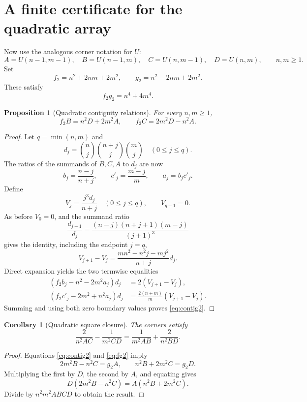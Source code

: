 \documentclass[11pt]{article}
\numberwithin{equation}{section}
\newtheorem{proposition}[theorem]{Proposition}
\newtheorem{corollary}[theorem]{Corollary}
\theoremstyle{definition}
\theoremstyle{remark}
\begin{document}
\section{A finite certificate for the quadratic array}\label{sec:quadratic}

Now use the analogous corner notation for $U$:
\[
 A=U(n-1,m-1),\quad B=U(n-1,m),\quad
 C=U(n,m-1),\quad D=U(n,m),
 \qquad n,m\geq1.
\]
Set
\begin{equation}\label{eq:f2g2}
 f_2=n^2+2nm+2m^2,\qquad g_2=n^2-2nm+2m^2.
\end{equation}
These satisfy
\begin{equation}\label{eq:fg2}
 f_2g_2=n^4+4m^4.
\end{equation}

\begin{proposition}[Quadratic contiguity relations]\label{prop:contig2}
For every $n,m\geq1$,
\begin{equation}\label{eq:contig2}
 \boxed{f_2B=n^2D+2m^2A,\qquad f_2C=2m^2D-n^2A.}
\end{equation}
\end{proposition}
\begin{proof}
Let $q=\min(n,m)$ and
\[
 d_j=\binom nj\binom{n+j}j\binom mj\quad(0\leq j\leq q).
\]
The ratios of the summands of $B,C,A$ to $d_j$ are now
\[
 b_j=\frac{n-j}{n+j},\qquad c'_j=\frac{m-j}{m},\qquad a_j=b_jc'_j.
\]
Define
\begin{equation}\label{eq:V}
 V_j=\frac{j^3d_j}{n+j}\quad(0\leq j\leq q),\qquad V_{q+1}=0.
\end{equation}
As before $V_0=0$, and the summand ratio
\[
 \frac{d_{j+1}}{d_j}
 =\frac{(n-j)(n+j+1)(m-j)}{(j+1)^3}
\]
gives the identity, including the endpoint $j=q$,
\begin{equation}\label{eq:deltaV}
 V_{j+1}-V_j=\frac{mn^2-n^2j-mj^2}{n+j}d_j.
\end{equation}
Direct expansion yields the two termwise equalities
\begin{align*}
 (f_2b_j-n^2-2m^2a_j)d_j&=2(V_{j+1}-V_j),\\
 (f_2c'_j-2m^2+n^2a_j)d_j&=\frac{2(n+m)}m(V_{j+1}-V_j).
\end{align*}
Summing and using both zero boundary values proves \eqref{eq:contig2}.
\end{proof}

\begin{corollary}[Quadratic square closure]\label{cor:closed2}
The corners satisfy
\begin{equation}\label{eq:closed2}
 \frac2{n^2AC}-\frac1{m^2CD}
 =\frac1{m^2AB}+\frac2{n^2BD}.
\end{equation}
\end{corollary}
\begin{proof}
Equations \eqref{eq:contig2} and \eqref{eq:fg2} imply
\[
 2m^2B-n^2C=g_2A,\qquad n^2B+2m^2C=g_2D.
\]
Multiplying the first by $D$, the second by $A$, and equating gives
\[
 D(2m^2B-n^2C)=A(n^2B+2m^2C).
\]
Divide by $n^2m^2ABCD$ to obtain the result.
\end{proof}
\end{document}
